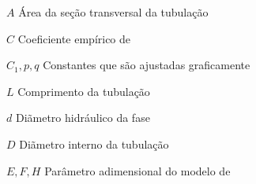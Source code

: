 \begin{simbolos}

   \item[$A$] Área da seção transversal da tubulação \space [$m^2$]
   \item[$C$] Coeficiente empírico de \cite{chisholm-1967} \space [$-$] 
   \item[$C_1,p,q$] Constantes que são ajustadas graficamente \space [$-$]
   \item[$L$] Comprimento da tubulação \space [$m$]
   \item[$d$] Diãmetro hidráulico da fase \space [$m$]
   \item[$D$] Diãmetro interno da tubulação \space [$m$]
   \item[$E,F,H$] Parâmetro adimensional do modelo de \cite{Friedel-1979} \space [$-$]
   

\end{simbolos}
